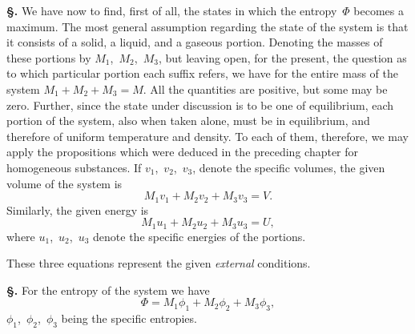 \documentclass[12pt]{book}[2005/09/16]
\newcommand{\Section}[1]{
  \medskip\par\textbf{§\;#1}
  \label{section:#1}
}
\newcommand{\PageSep}[1]{\ignorespaces}
\begin{document}
\Section{166.} We have now to find, first of all, the states in which
the entropy~$\Phi$ becomes a maximum. The most general assumption
regarding the state of the system is that it consists
of a solid, a liquid, and a gaseous portion. Denoting the
masses of these portions by $M_{1}$,~$M_{2}$,~$M_{3}$, but leaving open,
for the present, the question as to which particular portion
each suffix refers, we have for the entire mass of the system
$M_{1} + M_{2} + M_{3} = M$. All the quantities are positive, but
some may be zero. Further, since the state under discussion
is to be one of equilibrium, each portion of the system, also
when taken alone, must be in equilibrium, and therefore of
uniform temperature and density. To each of them, therefore,
we may apply the propositions which were deduced in
the preceding chapter for homogeneous substances. If
$v_{1}$,~$v_{2}$,~$v_{3}$, denote the specific volumes, the given volume of
the system is
\[
M_{1} v_{1} + M_{2} v_{2} + M_{3} v_{3} = V.
\]
Similarly, the given energy is
\[
M_{1} u_{1} + M_{2} u_{2} + M_{3} u_{3} = U,
\]
where $u_{1}$,~$u_{2}$,~$u_{3}$ denote the specific energies of the portions.
\PageSep{134}

These three equations represent the given \emph{external}
conditions.

\Section{167.} For the entropy of the system we have
\[
\Phi = M_{1} \phi_{1} + M_{2} \phi_{2} + M_{3} \phi_{3},
\]
$\phi_{1}$,~$\phi_{2}$,~$\phi_{3}$ being the specific entropies.
\end{document}
